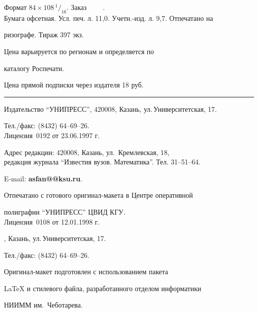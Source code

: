 Формат $84\times 108 \,^1/_{16}.$ Заказ $\qquad$.\\


Бумага офсетная. Усл. печ. л. 11,0. Учетн.-изд. л. 9,7. Отпечатано на 


ризографе. Тираж 397 экз. 





\noindent Цена варьируется по регионам и определяется по 


каталогу Роспечати. 





\noindent Цена прямой подписки через издателя 18 руб. 


\bigskip


\hrule


\bigskip


\noindent Издательство ``УНИПРЕСС'', 420008, Казань, ул.\,Университетская, 17.


Тел./факс: (8432) 64--69--26.\\


Лицензия \No\,0192 от 23.06.1997 г.


\smallskip





\noindent Адрес редакции: 420008, Казань, ул.~Кремлевская, 18,\\  


редакция журнала  ``Известия вузов. Математика''. Тел. 31--51--64.





\noindent E-mail: {\bf asfan@@ksu.ru}. \par


\bigskip 


\noindent Отпечатано с готового оригинал-макета в Центре оперативной


полиграфии ``УНИПРЕСС'' ЦВИД КГУ. \\


Лицензия \No\,0108 от 12.01.1998 г.





, Казань, ул.\,Университетская, 17.


Тел./факс: (8432) 64--69--26. \par


\bigskip


\noindent Оригинал-макет подготовлен с использованием пакета


\AmS\LaTeX{} и стилевого файла, разработанного отделом информатики


НИИММ им.~Чеботарева.








